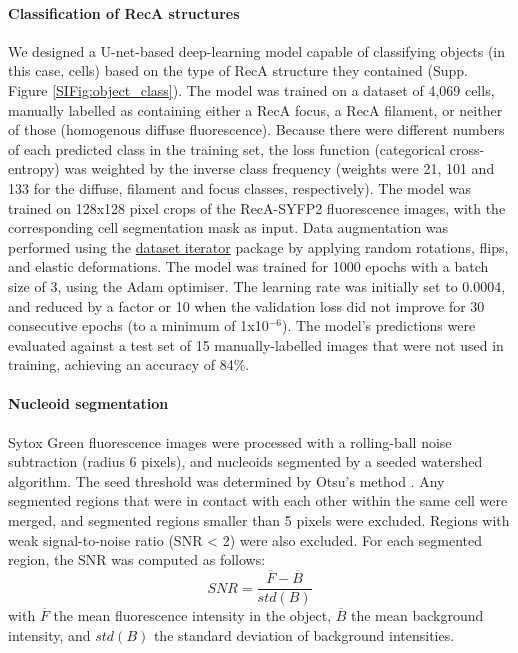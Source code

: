 \paragraph*{Classification of RecA structures}
We designed a U-net-based deep-learning model capable of classifying objects (in this case, cells) based on the type of RecA structure they contained (Supp. Figure \ref{SIFig:object_class}). The model was trained on a dataset of 4,069 cells, manually labelled as containing either a RecA focus, a RecA filament, or neither of those (homogenous diffuse fluorescence). Because there were different numbers of each predicted class in the training set, the loss function (categorical cross-entropy) was weighted by the inverse class frequency (weights were 21, 101 and 133 for the diffuse, filament and focus classes, respectively). The model was trained on 128x128 pixel crops of the RecA-SYFP2 fluorescence images, with the corresponding cell segmentation mask as input. Data augmentation was performed using the \href{https://github.com/jeanollion/dataset_iterator}{dataset iterator} package by applying random rotations, flips, and elastic deformations. The model was trained for 1000 epochs with a batch size of 3, using the Adam optimiser. The learning rate was initially set to 0.0004, and reduced by a factor or 10 when the validation loss did not improve for 30 consecutive epochs (to a minimum of 1x10$^{-6}$). The model's predictions were evaluated against a test set of 15 manually-labelled images that were not used in training, achieving an accuracy of 84\%.

\paragraph*{Nucleoid segmentation}
Sytox Green fluorescence images were processed with a rolling-ball noise subtraction (radius 6 pixels), and nucleoids segmented by a seeded watershed algorithm. The seed threshold was determined by Otsu's method \cite{Otsu1979}. Any segmented regions that were in contact with each other within the same cell were merged, and segmented regions smaller than 5 pixels were excluded. Regions with weak signal-to-noise ratio (SNR < 2) were also excluded. For each segmented region, the SNR was computed as follows:
\begin{equation}
    SNR = \dfrac{\overline{F}-\overline{B}}{std(B)}
\end{equation}
with $\overline{F}$ the mean fluorescence intensity in the object, $\overline{B}$ the mean background intensity, and $std(B)$ the standard deviation of background intensities.

